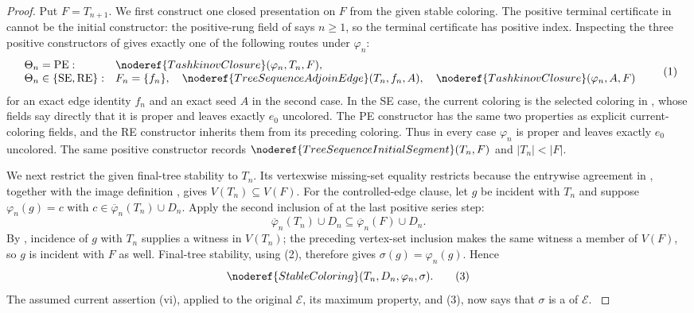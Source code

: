\begin{proof}
Put \(F=T_{n+1}\).  We first construct one closed presentation on \(F\)
from the given stable coloring.  The positive terminal certificate in
 cannot be the initial constructor: the
positive-rung field of  says \(n\geq1\),
so the terminal certificate has positive index.  Inspecting the three
positive constructors of  gives exactly one
of the following routes under \(\varphi_n\):
\[
\begin{array}{ll}
\Theta_n=\mathrm{PE}:&
 \noderef{TashkinovClosure}(\varphi_n,T_n,F),\\
\Theta_n\in\{\mathrm{SE},\mathrm{RE}\}:&
 F_n=\{f_n\},\quad
 \noderef{TreeSequenceAdjoinEdge}(T_n,f_n,A),\quad
 \noderef{TashkinovClosure}(\varphi_n,A,F)
\end{array}                                                    \tag{1}
\]
for an exact edge identity \(f_n\) and an exact seed \(A\) in the second
case.  In the SE case, the current coloring is the selected coloring in
, whose fields say directly that it is
proper and leaves exactly \(e_0\) uncolored.  The PE constructor has the
same two properties as explicit current-coloring fields, and the RE
constructor inherits them from its preceding coloring.  Thus in every
case \(\varphi_n\) is proper and leaves exactly \(e_0\) uncolored.  The
same positive constructor records
\(\noderef{TreeSequenceInitialSegment}(T_n,F)\) and
\(|T_n|<|F|\).

We next restrict the given final-tree stability to \(T_n\).  Its
vertexwise missing-set equality restricts because the entrywise agreement
in , together with the image
definition , gives
\(V(T_n)\subseteq V(F)\).  For the controlled-edge clause, let \(g\) be
incident with \(T_n\) and suppose
\(\varphi_n(g)=c\) with
\(c\in\overline\varphi_n(T_n)\cup D_n\).  Apply the second inclusion of
 at the last positive series step:
\[
 \overline\varphi_n(T_n)\cup D_n
       \subseteq \overline\varphi_n(F)\cup D_n.                \tag{2}
\]
By , incidence of \(g\) with \(T_n\) supplies
a witness in \(V(T_n)\); the preceding vertex-set inclusion makes the
same witness a member of \(V(F)\), so \(g\) is incident with \(F\) as
well.  Final-tree stability, using (2), therefore gives
\(\sigma(g)=\varphi_n(g)\).  Hence
\[
             \noderef{StableColoring}(T_n,D_n,\varphi_n,\sigma).
                                                                    \tag{3}
\]
The assumed current assertion (vi), applied to the original
\(\mathcal E\), its maximum property, and (3), now says that \(\sigma\)
is a  of \(\mathcal E\).                 \(\tag{4}\)


\end{proof}
